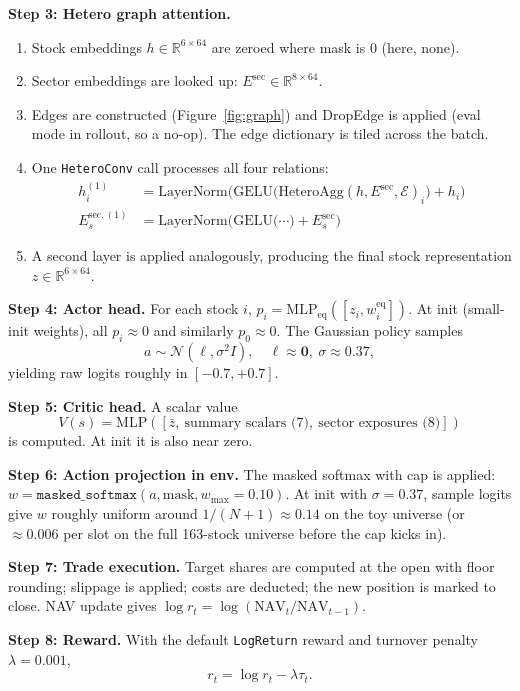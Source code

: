 \documentclass[11pt,a4paper]{article}
\begin{document}
\textbf{Step 3: Hetero graph attention.}
\begin{enumerate}
\item Stock embeddings $h \in \mathbb{R}^{6 \times 64}$ are zeroed where mask is 0
(here, none).
\item Sector embeddings are looked up: $E^{\text{sec}} \in \mathbb{R}^{8 \times 64}$.
\item Edges are constructed (Figure~\ref{fig:graph}) and DropEdge is applied
(eval mode in rollout, so a no-op). The edge dictionary is tiled across the batch.
\item One \texttt{HeteroConv} call processes all four relations:
\begin{align}
h_i^{(1)} &= \text{LayerNorm}\Big( \text{GELU}\big(
  \text{HeteroAgg}(h, E^{\text{sec}}, \mathcal{E})_i
\big) + h_i \Big) \\
E_s^{\text{sec}, (1)} &= \text{LayerNorm}\Big( \text{GELU}\big(
  \cdots
\big) + E_s^{\text{sec}} \Big)
\end{align}
\item A second layer is applied analogously, producing the final stock representation
$z \in \mathbb{R}^{6 \times 64}$.
\end{enumerate}

\textbf{Step 4: Actor head.} For each stock $i$,
$p_i = \text{MLP}_{\text{eq}}([z_i, w_i^{\text{eq}}])$.
At init (small-init weights), all $p_i \approx 0$ and similarly $p_0 \approx 0$.
The Gaussian policy samples
\[ a \sim \mathcal{N}(\ell, \sigma^2 I),\quad \ell \approx \mathbf{0},\ \sigma \approx 0.37, \]
yielding raw logits roughly in $[-0.7, +0.7]$.

\textbf{Step 5: Critic head.} A scalar value
\[ V(s) = \text{MLP}([\bar{z},\ \text{summary scalars (7)},\ \text{sector exposures (8)}]) \]
is computed. At init it is also near zero.

\textbf{Step 6: Action projection in env.} The masked softmax with cap is applied:
$w = \texttt{masked\_softmax}(a, \text{mask}, w_{\max}=0.10)$.
At init with $\sigma = 0.37$, sample logits give $w$ roughly uniform around
$1/(N+1) \approx 0.14$ on the toy universe (or $\approx 0.006$ per slot on the full
163-stock universe before the cap kicks in).

\textbf{Step 7: Trade execution.} Target shares are computed at the open with floor
rounding; slippage is applied; costs are deducted; the new position is marked to
close. NAV update gives $\log r_t = \log(\text{NAV}_t / \text{NAV}_{t-1})$.

\textbf{Step 8: Reward.} With the default \texttt{LogReturn} reward and turnover
penalty $\lambda = 0.001$,
\[ r_t = \log r_t - \lambda \tau_t. \]
\end{document}
